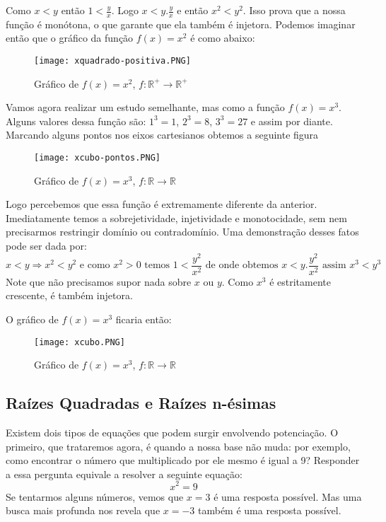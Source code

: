 Como $x<y$ então $1<\frac{y}{x}$. Logo $x< y . \frac{y}{x}$ e então $ x^2 < y^2$. Isso prova que a nossa função é monótona, o que garante que ela também é injetora. Podemos imaginar então que o gráfico da função $f(x)=x^2$ é como abaixo:

\begin{figure}[h]
	\centering
		\texttt{[image: xquadrado-positiva.PNG]}
		\caption{Gráfico de $f(x)=x^2$, $f\colon \mathbb{R}^+ \to \mathbb{R}^+$}
	\label{fig:xquadrado-positiva}
\end{figure}

Vamos agora realizar um estudo semelhante, mas como a função $f(x)=x^3$. Alguns valores dessa função são: $1^3=1$, $2^3=8$, $3^3=27$ e assim por diante. Marcando alguns pontos nos eixos cartesianos obtemos a seguinte figura

\begin{figure}[h]
	\centering
		\texttt{[image: xcubo-pontos.PNG]}
		\caption{Gráfico de $f(x)=x^3$, $f\colon \mathbb{R} \to \mathbb{R}$}
	\label{fig:xcubo-pontos}
\end{figure}

Logo percebemos que essa função é extremamente diferente da anterior. Imediatamente temos a sobrejetividade, injetividade e monotocidade, sem nem precisarmos restringir domínio ou contradomínio. Uma demonstração desses fatos pode ser dada por: $$x< y \Rightarrow x^2 < y^2 \text{ e como } x^2>0 \text{ temos } 1 < \frac{y^2}{x^2} \text{ de onde obtemos } x < y . \frac{y^2}{x^2} \text{ assim } x^3 < y^3$$Note que não precisamos supor nada sobre $x$ ou $y$. Como $x^3$ é estritamente crescente, é também injetora.

O gráfico de $f(x) = x^3$ ficaria então:
\begin{figure}[h]
	\centering
		\texttt{[image: xcubo.PNG]}
		\caption{Gráfico de $f(x)=x^3$, $f\colon \mathbb{R} \to \mathbb{R}$}
	\label{fig:xcubo}
\end{figure}

\subsection{Raízes Quadradas e Raízes n-ésimas}
Existem dois tipos de equações que podem surgir envolvendo potenciação. O primeiro, que trataremos agora, é quando a nossa base não muda: por exemplo, como encontrar o número que multiplicado por ele mesmo é igual a 9? Responder a essa pergunta equivale a resolver a seguinte equação: $$x^2=9$$Se tentarmos alguns números, vemos que $x=3$ é uma resposta possível. Mas uma busca mais profunda nos revela que $x=-3$ também é uma resposta possível.

